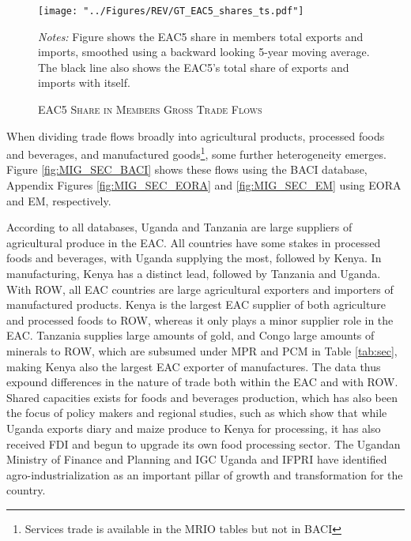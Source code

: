 \documentclass[a4paper]{article}
\begin{document}
\begin{figure}[h!] %
\centering
\caption{\label{fig:GTEACshares}\textsc{EAC5 Share in Members Gross Trade Flows}}
\texttt{[image: "../Figures/REV/GT\_EAC5\_shares\_ts.pdf"]} \\ %
\raggedright
\scriptsize 
\emph{Notes:} Figure shows the EAC5 share in members total exports and imports, smoothed using a backward looking 5-year moving average. The black line also shows the EAC5's total share of exports and imports with itself.
\end{figure}
\FloatBarrier


When dividing trade flows broadly into agricultural products, processed foods and beverages, and manufactured goods\footnote{Services trade is available in the MRIO tables but not in BACI}, some further heterogeneity emerges. Figure \ref{fig:MIG_SEC_BACI} shows these flows using the BACI database, Appendix Figures \ref{fig:MIG_SEC_EORA} and \ref{fig:MIG_SEC_EM} using EORA and EM, respectively. \newline 

According to all databases, Uganda and Tanzania are large suppliers of agricultural produce in the EAC. All countries have some stakes in processed foods and beverages, with Uganda supplying the most, followed by Kenya. In manufacturing, Kenya has a distinct lead, followed by Tanzania and Uganda. With ROW, all EAC countries are large agricultural exporters and importers of manufactured products. Kenya is the largest EAC supplier of both agriculture and processed foods to ROW, whereas it only plays a minor supplier role in the EAC. Tanzania supplies large amounts of gold, and Congo large amounts of minerals to ROW, which are subsumed under MPR and PCM in Table \ref{tab:sec}, making Kenya also the largest EAC exporter of manufactures. The data thus expound differences in the nature of trade both within the EAC and with ROW. Shared capacities exists for foods and beverages production, which has also been the focus of policy makers and regional studies, such as \citet{Daly2017RVCs} which show that while Uganda exports diary and maize produce to Kenya for processing, it has also received FDI and begun to upgrade its own food processing sector. The Ugandan Ministry of Finance and Planning and IGC Uganda \citep{EGF21, fowler2019agro} and IFPRI \citep{van2020institutional} have identified agro-industrialization as an important pillar of growth and transformation for the country. 
\end{document}
